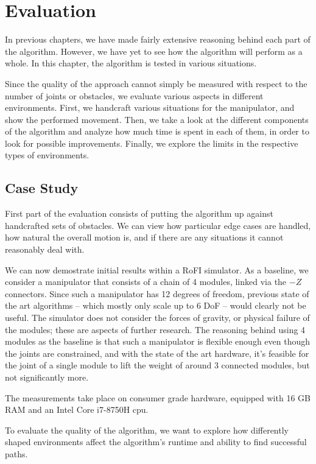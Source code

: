 \chapter{Evaluation}

In previous chapters, we have made fairly extensive reasoning behind each part of the algorithm. However, we have yet to see how the algorithm will perform as a whole. In this chapter, the algorithm is tested in various situations.

Since the quality of the approach cannot simply be measured with respect to the number of joints or obstacles, we evaluate various aspects in different environments. First, we handcraft various situations for the manipulator, and show the performed movement. Then, we take a look at the different components of the algorithm and analyze how much time is spent in each of them, in order to look for possible improvements. Finally, we explore the limits in the respective types of environments.

\section{Case Study}\label{study}

First part of the evaluation consists of putting the algorithm up against handcrafted sets of obstacles. We can view how particular edge cases are handled, how natural the overall motion is, and if there are any situations it cannot reasonably deal with.

We can now demostrate initial results within a RoFI simulator. As a baseline, we consider a manipulator that consists of a chain of 4 modules, linked via the $-Z$ connectors. Since such a manipulator has 12 degrees of freedom, previous state of the art algorithms -- which mostly only scale up to 6 DoF -- would clearly not be useful.
The simulator does not consider the forces of gravity, or physical failure of the modules; these are aspects of further research. The reasoning behind using 4 modules as the baseline is that such a manipulator is flexible enough even though the joints are constrained, and with the state of the art hardware, it's feasible for the joint of a single module to lift the weight of around 3 connected modules, but not significantly more.

The measurements take place on consumer grade hardware, equipped with 16 GB RAM and an Intel Core i7-8750H cpu.

To evaluate the quality of the algorithm, we want to explore how differently shaped environments affect the algorithm's runtime and ability to find successful paths.

